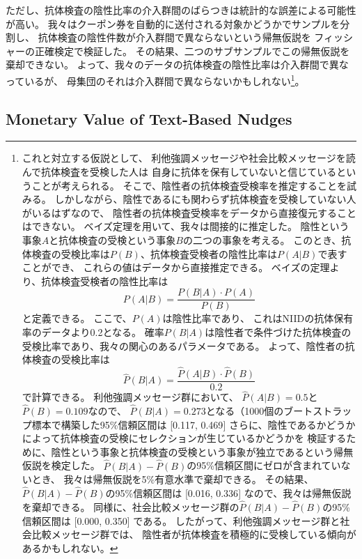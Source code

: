 \documentclass[
  11pt,
  a4paper,
]{article}
\begin{document}
ただし、抗体検査の陰性比率の介入群間のばらつきは統計的な誤差による可能性が高い。
我々はクーポン券を自動的に送付される対象かどうかでサンプルを分割し、
抗体検査の陰性件数が介入群間で異ならないという帰無仮説を
フィッシャーの正確検定で検証した。
その結果、二つのサブサンプルでこの帰無仮説を棄却できない。
よって、我々のデータの抗体検査の陰性比率は介入群間で異なっているが、
母集団のそれは介入群間で異ならないかもしれない\footnote{これと対立する仮説として、
  利他強調メッセージや社会比較メッセージを読んで抗体検査を受検した人は
  自身に抗体を保有していないと信じているということが考えられる。
  そこで、陰性者の抗体検査受検率を推定することを試みる。
  しかしながら、陰性であるにも関わらず抗体検査を受検していない人がいるはずなので、
  陰性者の抗体検査受検率をデータから直接復元することはできない。
  ベイズ定理を用いて、我々は間接的に推定した。
  陰性という事象\(A\)と抗体検査の受検という事象\(B\)の二つの事象を考える。
  このとき、抗体検査の受検比率は\(P(B)\)、抗体検査受検者の陰性比率は\(P(A|B)\)で表すことができ、
  これらの値はデータから直接推定できる。
  ベイズの定理より、抗体検査受検者の陰性比率は
  \[ P(A|B) = \frac{P(B|A) \cdot P(A)}{P(B)} \]
  と定義できる。
  ここで、\(P(A)\)は陰性比率であり、
  これはNIIDの抗体保有率のデータより0.2となる。
  確率\(P(B|A)\)は陰性者で条件づけた抗体検査の受検比率であり、我々の関心のあるパラメータである。
  よって、陰性者の抗体検査の受検比率は
  \[ \hat{P}(B|A) = \frac{\hat{P}(A|B) \cdot \hat{P}(B)}{0.2} \]
  で計算できる。
  利他強調メッセージ群において、
  \(\hat{P}(A|B) = 0.5\)と\(\hat{P}(B) = 0.109\)なので、
  \(\hat{P}(B|A) = 0.273\)となる（1000個のブートストラップ標本で構築した95\%信頼区間は
  {[}0.117, 0.469{]}
  さらに、陰性であるかどうかによって抗体検査の受検にセレクションが生じているかどうかを
  検証するために、陰性という事象と抗体検査の受検という事象が独立であるという帰無仮説を検定した。
  \(\hat{P}(B|A) - \hat{P}(B)\)の95\%信頼区間にゼロが含まれていないとき、
  我々は帰無仮説を5\%有意水準で棄却できる。
  その結果、\(\hat{P}(B|A) - \hat{P}(B)\)の95\%信頼区間は
  {[}0.016, 0.336{]}
  なので、我々は帰無仮説を棄却できる。
  同様に、社会比較メッセージ群の\(\hat{P}(B|A) - \hat{P}(B)\)の95\%信頼区間は
  {[}0.000, 0.350{]}
  である。
  したがって、利他強調メッセージ群と社会比較メッセージ群では、
  陰性者が抗体検査を積極的に受検している傾向があるかもしれない。}。

\hypertarget{econvalue}{%
\subsection{Monetary Value of Text-Based Nudges}\label{econvalue}}
\end{document}
